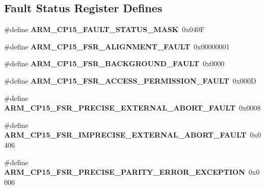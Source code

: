 \subsection*{Fault Status Register Defines}
\begin{DoxyCompactItemize}
\item 
\mbox{\label{group__RTEMSScoreCPUARMCP15_gaff7eed80ae19de63483a022d283e78f6}} 
\#define {\bfseries A\+R\+M\+\_\+\+C\+P15\+\_\+\+F\+A\+U\+L\+T\+\_\+\+S\+T\+A\+T\+U\+S\+\_\+\+M\+A\+SK}~0x040F
\item 
\mbox{\label{group__RTEMSScoreCPUARMCP15_gaa69322de72fadaeca8630a00e003bbad}} 
\#define {\bfseries A\+R\+M\+\_\+\+C\+P15\+\_\+\+F\+S\+R\+\_\+\+A\+L\+I\+G\+N\+M\+E\+N\+T\+\_\+\+F\+A\+U\+LT}~0x00000001
\item 
\mbox{\label{group__RTEMSScoreCPUARMCP15_gacac712086e6c3b5b89f175f8764fe96a}} 
\#define {\bfseries A\+R\+M\+\_\+\+C\+P15\+\_\+\+F\+S\+R\+\_\+\+B\+A\+C\+K\+G\+R\+O\+U\+N\+D\+\_\+\+F\+A\+U\+LT}~0x0000
\item 
\mbox{\label{group__RTEMSScoreCPUARMCP15_ga8f73baf65e26290668d6621f1fe41d13}} 
\#define {\bfseries A\+R\+M\+\_\+\+C\+P15\+\_\+\+F\+S\+R\+\_\+\+A\+C\+C\+E\+S\+S\+\_\+\+P\+E\+R\+M\+I\+S\+S\+I\+O\+N\+\_\+\+F\+A\+U\+LT}~0x000D
\item 
\mbox{\label{group__RTEMSScoreCPUARMCP15_ga71977a2c63277c2f7d2a1f753441f43a}} 
\#define {\bfseries A\+R\+M\+\_\+\+C\+P15\+\_\+\+F\+S\+R\+\_\+\+P\+R\+E\+C\+I\+S\+E\+\_\+\+E\+X\+T\+E\+R\+N\+A\+L\+\_\+\+A\+B\+O\+R\+T\+\_\+\+F\+A\+U\+LT}~0x0008
\item 
\mbox{\label{group__RTEMSScoreCPUARMCP15_ga2a79da79c5f0e740ebe2c8bd401f5544}} 
\#define {\bfseries A\+R\+M\+\_\+\+C\+P15\+\_\+\+F\+S\+R\+\_\+\+I\+M\+P\+R\+E\+C\+I\+S\+E\+\_\+\+E\+X\+T\+E\+R\+N\+A\+L\+\_\+\+A\+B\+O\+R\+T\+\_\+\+F\+A\+U\+LT}~0x0406
\item 
\mbox{\label{group__RTEMSScoreCPUARMCP15_gaeedd5b2f621a2a8a2e75679665077876}} 
\#define {\bfseries A\+R\+M\+\_\+\+C\+P15\+\_\+\+F\+S\+R\+\_\+\+P\+R\+E\+C\+I\+S\+E\+\_\+\+P\+A\+R\+I\+T\+Y\+\_\+\+E\+R\+R\+O\+R\+\_\+\+E\+X\+C\+E\+P\+T\+I\+ON}~0x0006

\end{DoxyCompactItemize}
